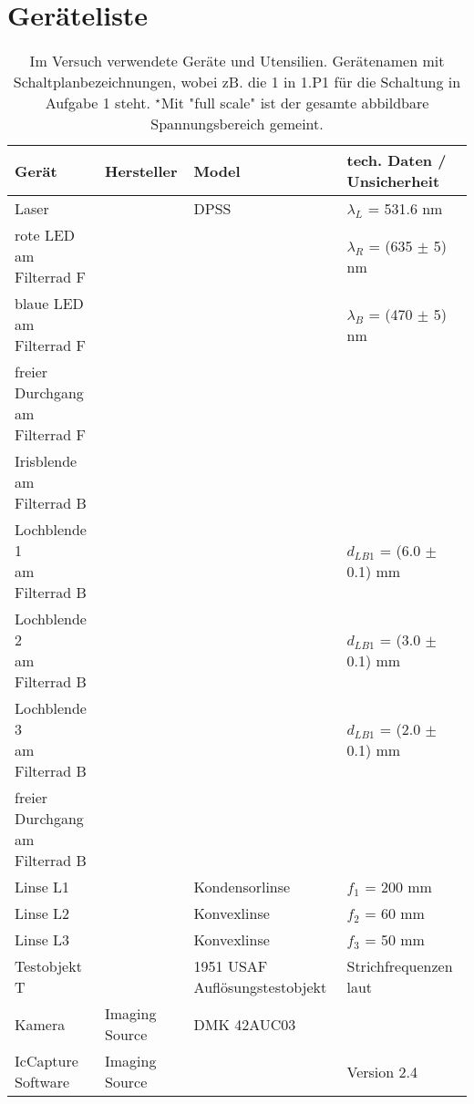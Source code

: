 \section{Geräteliste}
\label{sec:geraeteliste}
\begin{table}[H]
	\centering
	\caption{
		Im Versuch verwendete Geräte und Utensilien.
		Gerätenamen mit Schaltplanbezeichnungen, wobei zB. die 1 in 1.P1 für die Schaltung in Aufgabe 1 steht.
		$^\star$Mit "full scale" ist der gesamte abbildbare Spannungsbereich gemeint.}
	\begin{tabular}[h]{| l | l | l | l |}
		\hline
		Gerät       & Hersteller   & Model  & tech. Daten / Unsicherheit       \\\hline
		\hline
		Laser &  \allc  & DPSS \cite{DPSS} & $\lambda_L$ = 531.6 nm \\\hline
		\makecell[l]{rote LED \\ am Filterrad F}& \allc & \allc & $\lambda_R$ = (635 $\pm$ 5) nm \\\hline
		\makecell[l]{blaue LED \\ am Filterrad F}& \allc & \allc & $\lambda_B$ = (470 $\pm$ 5) nm \\\hline
		\makecell[l]{freier Durchgang \\ am Filterrad F}& \allc & \allc & \allc \\\hline
		\makecell[l]{Irisblende \\ am Filterrad B}& \allc & \allc & \allc \\\hline
		\makecell[l]{Lochblende 1 \\ am Filterrad B}& \allc & \allc & $d_{LB1}$ = (6.0 $\pm$ 0.1) mm\\\hline
		\makecell[l]{Lochblende 2 \\ am Filterrad B}& \allc & \allc & $d_{LB1}$ = (3.0 $\pm$ 0.1) mm\\\hline
		\makecell[l]{Lochblende 3 \\ am Filterrad B}& \allc & \allc & $d_{LB1}$ = (2.0 $\pm$ 0.1) mm\\\hline
		\makecell[l]{freier Durchgang \\ am Filterrad B}& \allc & \allc & \allc \\\hline
		Linse L1 & \allc & Kondensorlinse & $f_1$ = 200 mm \\\hline
		Linse L2 & \allc & Konvexlinse & $f_2$ = 60 mm \\\hline
		Linse L3 & \allc & Konvexlinse & $f_3$ = 50 mm \\\hline
		Testobjekt T & \allc & 1951 USAF Auflösungstestobjekt & Strichfrequenzen laut \cite{USAF} \\\hline
		Kamera & Imaging Source & DMK 42AUC03 & \allc \\\hline
		IcCapture Software & Imaging Source & \allc & Version 2.4 \\\hline
	\end{tabular}
	\label{tab:Geraeteliste}
\end{table}
\newpage